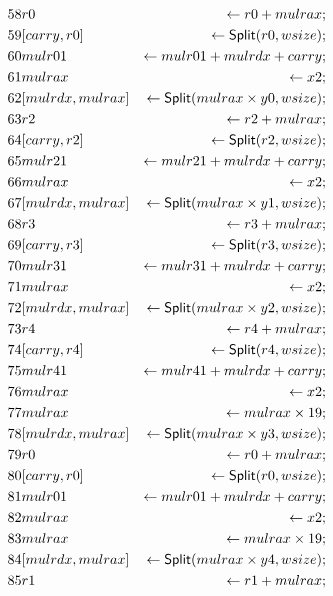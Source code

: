 \begin{align*}
58 & r0 & \leftarrow r0 + mulrax; \\
59 & \concat{carry}{r0} & \leftarrow \dslcode{Split}(r0, wsize); \\
60 & mulr01 & \leftarrow mulr01 + mulrdx + carry; \\
61 & mulrax & \leftarrow x2; \\
62 & \concat{mulrdx}{mulrax} & \leftarrow \dslcode{Split}(mulrax \times y0, wsize); \\
63 & r2 & \leftarrow r2 + mulrax; \\
64 & \concat{carry}{r2} & \leftarrow \dslcode{Split}(r2, wsize); \\
65 & mulr21 & \leftarrow mulr21 + mulrdx + carry; \\
66 & mulrax & \leftarrow x2; \\
67 & \concat{mulrdx}{mulrax} & \leftarrow \dslcode{Split}(mulrax \times y1, wsize); \\
68 & r3 & \leftarrow r3 + mulrax; \\
69 & \concat{carry}{r3} & \leftarrow \dslcode{Split}(r3, wsize); \\
70 & mulr31 & \leftarrow mulr31 + mulrdx + carry; \\
71 & mulrax & \leftarrow x2; \\
72 & \concat{mulrdx}{mulrax} & \leftarrow \dslcode{Split}(mulrax \times y2, wsize); \\
73 & r4 & \leftarrow r4 + mulrax; \\
74 & \concat{carry}{r4} & \leftarrow \dslcode{Split}(r4, wsize); \\
75 & mulr41 & \leftarrow mulr41 + mulrdx + carry; \\
76 & mulrax & \leftarrow x2; \\
77 & mulrax & \leftarrow mulrax \times 19; \\
78 & \concat{mulrdx}{mulrax} & \leftarrow \dslcode{Split}(mulrax \times y3, wsize); \\
79 & r0 & \leftarrow r0 + mulrax; \\
80 & \concat{carry}{r0} & \leftarrow \dslcode{Split}(r0, wsize); \\
81 & mulr01 & \leftarrow mulr01 + mulrdx + carry; \\
82 & mulrax & \leftarrow x2; \\
83 & mulrax & \leftarrow mulrax \times 19; \\
84 & \concat{mulrdx}{mulrax} & \leftarrow \dslcode{Split}(mulrax \times y4, wsize); \\
85 & r1 & \leftarrow r1 + mulrax; \\

\end{align*}
